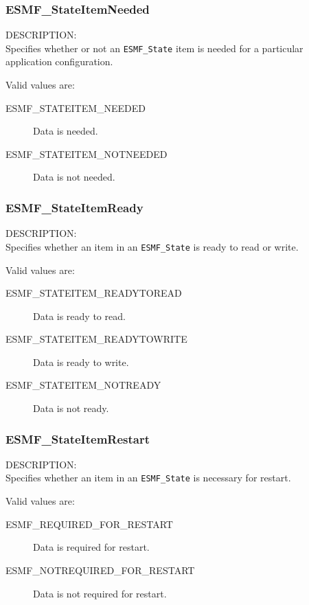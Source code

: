 
\subsubsection{ESMF\_StateItemNeeded}
\label{opt:stateitemneeded}
{\sf DESCRIPTION:\\}
Specifies whether or not an {\tt ESMF\_State} item is needed for a 
particular application configuration.

Valid values are:
\begin{description}
   \item [ESMF\_STATEITEM\_NEEDED] 
         Data is needed.
   \item [ESMF\_STATEITEM\_NOTNEEDED]
         Data is not needed.
\end{description}

\subsubsection{ESMF\_StateItemReady}
\label{opt:stateitemready}
{\sf DESCRIPTION:\\}
Specifies whether an item in an {\tt ESMF\_State} is ready to 
read or write.

Valid values are:
\begin{description}
   \item [ESMF\_STATEITEM\_READYTOREAD] 
         Data is ready to read.
   \item [ESMF\_STATEITEM\_READYTOWRITE]
         Data is ready to write.
   \item [ESMF\_STATEITEM\_NOTREADY]
         Data is not ready.
\end{description}

\subsubsection{ESMF\_StateItemRestart}
\label{opt:stateitemrestart}
{\sf DESCRIPTION:\\}
Specifies whether an item in an {\tt ESMF\_State} is necessary
for restart.

Valid values are:
\begin{description}
   \item [ESMF\_REQUIRED\_FOR\_RESTART] 
         Data is required for restart.
   \item [ESMF\_NOTREQUIRED\_FOR\_RESTART]
         Data is not required for restart.
\end{description}

